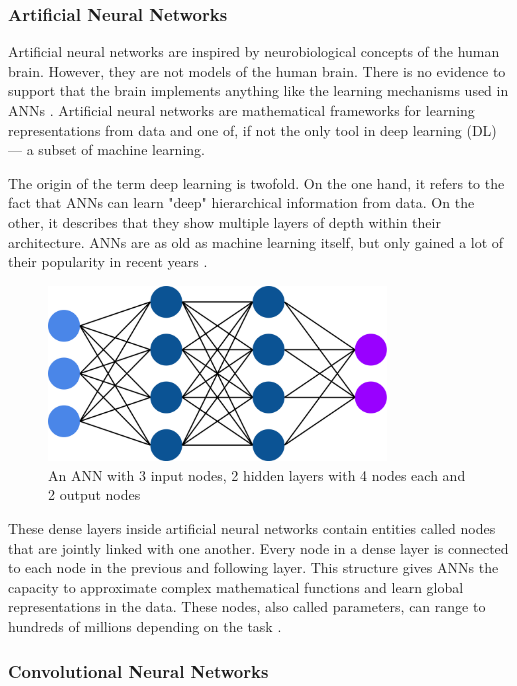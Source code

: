 \subsubsection{Artificial Neural Networks}

Artificial neural networks are inspired by neurobiological concepts of the human brain. However, they are not models of the human brain. There is no evidence to support that the brain implements anything like the learning mechanisms used in ANNs \cite{Chollet2017}. Artificial neural networks are mathematical frameworks for learning representations from data and one of, if not the only tool in deep learning (DL) --- a subset of machine learning.

The origin of the term deep learning is twofold. On the one hand, it refers to the fact that ANNs can learn "deep" hierarchical information from data. On the other, it describes that they show multiple layers of depth within their architecture. ANNs are as old as machine learning itself, but only gained a lot of their popularity in recent years \cite{Chollet2017}.

\begin{figure}[H]
\centering
\par
\includegraphics[width=0.8\textwidth]{imgs/ann.png}
\caption{An ANN with 3 input nodes, 2 hidden layers with 4 nodes each and 2 output nodes}
\par
\end{figure}

These dense layers inside artificial neural networks contain entities called nodes that are jointly linked with one another. Every node in a dense layer is connected to each node in the previous and following layer. This structure gives ANNs the capacity to approximate complex mathematical functions and learn global representations in the data. These nodes, also called parameters, can range to hundreds of millions depending on the task \cite{Simonyan2014a}.

\subsubsection{Convolutional Neural Networks}

